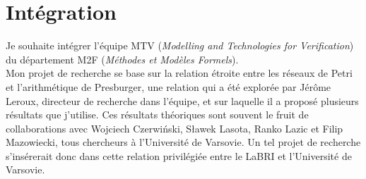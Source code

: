 









\vspace{10pt}
\section{Intégration}
\vspace{10pt}

Je souhaite intégrer l'équipe MTV (\emph{Modelling and Technologies for
Verification}) du département M2F (\emph{Méthodes et Modèles Formels}).\\

Mon projet de recherche se base sur la relation étroite entre les réseaux de
Petri et l'arithmétique de Presburger, une relation qui a été explorée par
Jérôme Leroux, directeur de recherche dans l'équipe, et sur laquelle il a
proposé plusieurs résultats que j'utilise. Ces résultats théoriques sont souvent
le fruit de collaborations avec Wojciech Czerwiński, S\l{}awek Lasota, Ranko Lazic
et Filip Mazowiecki, tous chercheurs à l'Université de Varsovie. Un tel projet
de recherche s'insérerait donc dans cette relation privilégiée entre le LaBRI et
l'Université de Varsovie.\\

